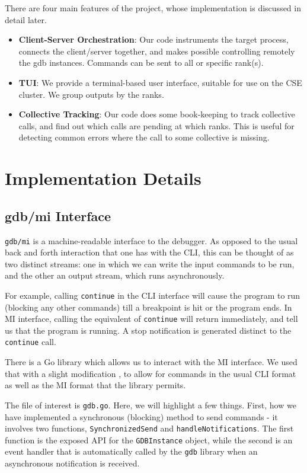 \documentclass[10pt,conference]{IEEEtran}
\begin{document}
There are four main features of the project, whose implementation is discussed in detail later.

\begin{itemize}
\item \textbf{Client-Server Orchestration}: Our code instruments the target process, connects the client/server together, and makes possible controlling remotely the gdb instances. Commands can be sent to all or specific rank(s).
\item \textbf{TUI}: We provide a terminal-based user interface, suitable for use on the CSE cluster. We group outputs by the ranks.
\item \textbf{Collective Tracking}: Our code does some book-keeping to track collective calls, and find out which calls are pending at which ranks. This is useful for detecting common errors where the call to some collective is missing.
\end{itemize}

\section{Implementation Details}
\label{sec:impl}

\subsection{gdb/mi Interface}

\texttt{gdb/mi} is a machine-readable interface to the debugger. As opposed to the usual back and forth interaction that one has with the CLI, this can be thought of as two distinct streams: one in which we can write the input commands to be run, and the other an output stream, which runs asynchronously.

For example, calling \texttt{continue} in the CLI interface will cause the program to run (blocking any other commands) till a breakpoint is hit or the program ends. In MI interface, calling the equivalent of \texttt{continue} will return immediately, and tell us that the program is running. A stop notification is generated distinct to the \texttt{continue} call.

There is a Go library \cite{gogdb} which allows us to interact with the MI interface. We used that with a slight modification \cite{gogdbm}, to allow for commands in the usual CLI format as well as the MI format that the library permits.

The file of interest is \texttt{gdb.go}. Here, we will highlight a few things. First, how we have implemented a synchronous (blocking) method to send commands - it involves two functions, \texttt{SynchronizedSend} and \texttt{handleNotifications}. The first function is the exposed API for the \texttt{GDBInstance} object, while the second is an event handler that is automatically called by the \texttt{gdb} library when an asynchronous notification is received.
\end{document}
